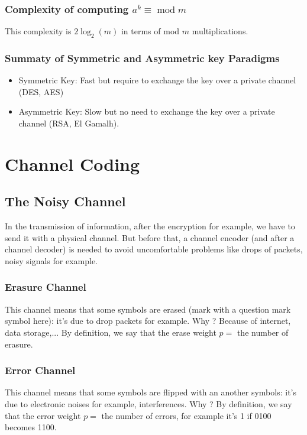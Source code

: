 \documentclass{article}
\begin{document}
\subsubsection{Complexity of computing $ a^k \equiv \;\mathrm{mod}\; m $} This complexity is $ 2\log_{2}(m) $ in terms of mod $ m $ multiplications.

\subsubsection{Summaty of Symmetric and Asymmetric key Paradigms}
\begin{itemize}
\item Symmetric Key: Fast but require to exchange the key over a private channel (DES, AES)
\item Asymmetric Key: Slow but no need to exchange the key over a private channel (RSA, El Gamalh).
\end{itemize}

\newpage
\section{Channel Coding}
\subsection{The Noisy Channel}
In the transmission of information, after the encryption for example, we have to send it with a physical channel. But before that, a channel encoder (and after a channel decoder) is needed to avoid uncomfortable problems like drops of packets, noisy signals for example.

\subsubsection{Erasure Channel}
This channel means that some symbols are erased (mark with a question mark symbol here): it's due to drop packets for example. Why ? Because of internet, data storage,... By definition, we say that the erase weight $ p = $ the number of erasure.

\subsubsection{Error Channel}
This channel means that some symbols are flipped with an another symbols: it's due to electronic noises for example, interferences. Why ? By definition, we say that the error weight $ p = $ the number of errors, for example it's 1 if 0100 becomes 1100.
\end{document}
